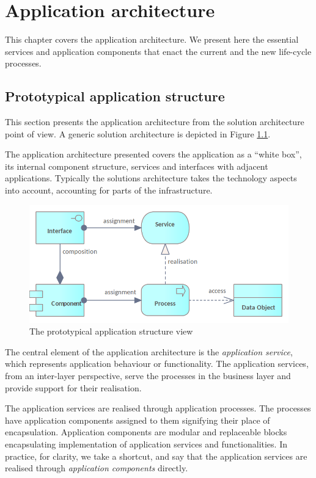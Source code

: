 \chapter{Application architecture}
\label{sec:application-architecture}

    This chapter covers the application architecture. We present here the essential services and application components that enact the current and the new life-cycle processes.

	\section{Prototypical application structure}
	
	This section presents the application architecture from the solution architecture point of view. A generic solution architecture is depicted in Figure \ref{fig:application-view}.
	
	The application architecture presented covers the application as a ``white box'', its internal component structure, services and interfaces with adjacent applications. Typically the solutions architecture takes the technology aspects into account, accounting for parts of the infrastructure.
	
    \begin{figure}[h]
		\centering
		\includegraphics[width=.6\textwidth]{images/views/Application view.png}
		\caption{The prototypical application structure view}
		\label{fig:application-view}
	\end{figure}

	The central element of the application architecture is the \textit{application service}, which represents application behaviour or functionality. The application services, from an inter-layer perspective, serve the processes in the business layer and provide support for their realisation. 
	
	The application services are realised through application processes. The processes have application components assigned to them signifying their place of encapsulation. Application components are modular and replaceable blocks encapsulating implementation of application services and functionalities. In practice, for clarity, we take a shortcut, and say that the application services are realised through \textit{application components} directly.
	
